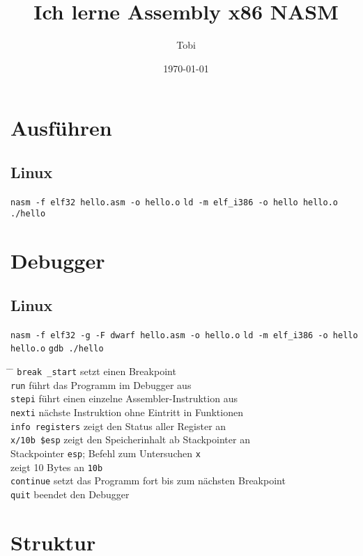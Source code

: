 \documentclass[a4paper,12pt,twoside]{article}
\title{Ich lerne Assembly x86 NASM}
\author{Tobi}
\date{\today}
\begin{document}
\maketitle
\thispagestyle{empty} %
\newpage

\tableofcontents
\newpage

\section{Ausführen}
\subsection{Linux}
\verb|nasm -f elf32 hello.asm -o hello.o| 
\verb|ld -m elf_i386 -o hello hello.o|
\verb|./hello|
\section{Debugger}
\subsection{Linux}
\verb|nasm -f elf32 -g -F dwarf hello.asm -o hello.o|
\verb|ld -m elf_i386 -o hello hello.o|
\verb|gdb ./hello|
\begin{tabbing}
  \hspace{2mm} \= \hspace{50mm} \= \kill
  \> \verb|break _start| \> setzt einen Breakpoint \\ 
  \> \verb|run| \> führt das Programm im Debugger aus \\ 
  \> \verb|stepi| \> führt einen einzelne Assembler-Instruktion aus \\ 
  \> \verb|nexti| \> nächste Instruktion ohne Eintritt in Funktionen \\ 
  \> \verb|info registers| \> zeigt den Status aller Register an \\ 
  \> \verb|x/10b $esp| \> zeigt den Speicherinhalt ab Stackpointer an \\ 
  \> \> Stackpointer \verb|esp|; Befehl zum Untersuchen \verb|x| \\ 
  \> \> zeigt 10 Bytes an \verb|10b| \\ 
  \> \verb|continue| \> setzt das Programm fort bis zum nächsten Breakpoint \\ 
  \> \verb|quit| \> beendet den Debugger \\
\end{tabbing}
\section{Struktur}
\end{document}
